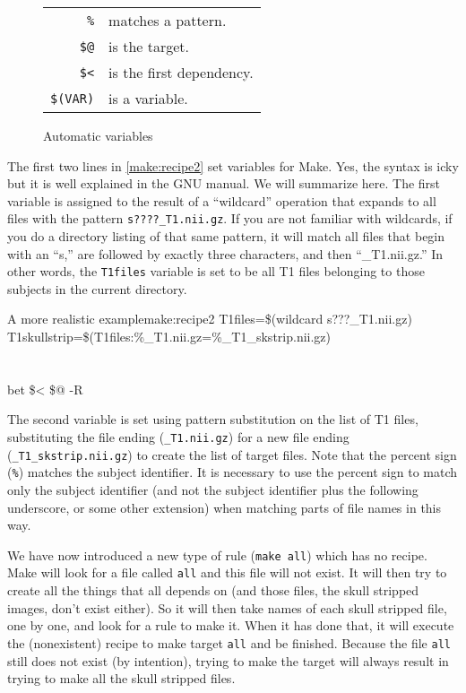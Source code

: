 \begin{figure}[h!]
	\begin{center}
		\begin{tabular}{ r l }
			\texttt{\%} 	& matches a pattern. \\
			\texttt{\$@}	& is the target. \\
			\texttt{\$<}	& is the first dependency. \\
			\texttt{\$(VAR)}& is a \maken{} variable.
		\end{tabular}
	\end{center}	
	\caption{Automatic \maken{} variables}
\end{figure}

The first two lines in \autoref{make:recipe2} set variables for Make. Yes, the syntax is icky but it is well explained in the GNU \maken{} manual. We will summarize here. The first variable is assigned to the result of a ``wildcard'' operation that expands to all files with the pattern \texttt{s????_T1.nii.gz}. If you are not familiar with wildcards, if you do a directory listing of that same pattern, it will match all files that begin with an ``s,'' are followed by exactly three characters, and then ``_T1.nii.gz.'' In other words, the \texttt{T1files} variable is set to be all T1 files belonging to those subjects in the current directory.
	
\begin{make}{A more realistic example}{make:recipe2}
	T1files=\$(wildcard s???_T1.nii.gz) \\
	T1skullstrip=\$(T1files:\%_T1.nii.gz=\%_T1_skstrip.nii.gz) \\
	 \\
		
	\\
	\tab bet \$< \$@ -R
\end{make}
	
The second variable is set using pattern substitution on the list of T1 files, substituting the file ending (\texttt{_T1.nii.gz}) for a new file ending (\texttt{_T1_skstrip.nii.gz}) to create the list of target files. Note that the percent sign (\texttt{\%}) matches the subject identifier. It is necessary to use the percent sign to match only the subject identifier (and not the subject identifier plus the following underscore, or some other extension) when matching parts of file names in this way. 
	
We have now introduced a new type of rule (\texttt{make all}) which has no recipe. Make will look for a file called \texttt{all} and this file will not exist. It will then try to create all the things that all depends on (and those files, the skull stripped images, don't exist either). So it will then take names of each skull stripped file, one by one, and look for a rule to make it. When it has done that, it will execute the (nonexistent) recipe to make target \texttt{all} and be finished. Because the file \texttt{all} still does not exist (by intention), trying to make the target will always result in trying to make all the skull stripped files.
	
